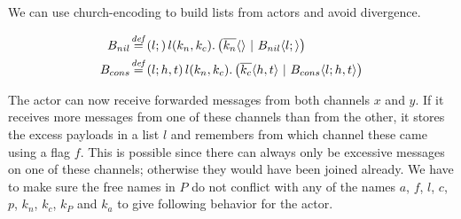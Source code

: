 
We can use church-encoding to build lists from actors and avoid divergence.


\begin{align*}
  \adef*{B_{nil}}{l}{}{\arcv{l}{k_n,k_c} . \parens{\asnd{k_n}{} \apar \ains{B_{nil}}{l}{}}}
  \\
  \adef*{B_{cons}}{l}{h,t}{\arcv{l}{k_n,k_c} . \parens{\asnd{k_c}{h,t} \apar \ains{B_{cons}}{l}{h,t}}}
\end{align*}

The actor can now receive forwarded messages from both channels $x$ and $y$.
If it receives more messages from one of these channels than from the other,
it stores the excess payloads in a list $l$ and remembers from which channel
these came using a flag $f$.
This is possible since there can always only be excessive messages on one of these channels;
otherwise they would have been joined already.
We have to make sure the free names in $P$ do not conflict with any of the names
$a$, $f$, $l$, $c$, $p$, $k_n$, $k_c$, $k_P$ and $k_a$
to give following behavior for the actor.

